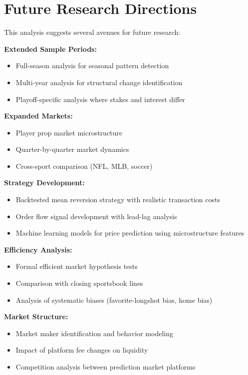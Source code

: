 \section{Future Research Directions}

This analysis suggests several avenues for future research:

\textbf{Extended Sample Periods:}
\begin{itemize}
    \item Full-season analysis for seasonal pattern detection
    \item Multi-year analysis for structural change identification
    \item Playoff-specific analysis where stakes and interest differ
\end{itemize}

\textbf{Expanded Markets:}
\begin{itemize}
    \item Player prop market microstructure
    \item Quarter-by-quarter market dynamics
    \item Cross-sport comparison (NFL, MLB, soccer)
\end{itemize}

\textbf{Strategy Development:}
\begin{itemize}
    \item Backtested mean reversion strategy with realistic transaction costs
    \item Order flow signal development with lead-lag analysis
    \item Machine learning models for price prediction using microstructure features
\end{itemize}

\textbf{Efficiency Analysis:}
\begin{itemize}
    \item Formal efficient market hypothesis tests
    \item Comparison with closing sportsbook lines
    \item Analysis of systematic biases (favorite-longshot bias, home bias)
\end{itemize}

\textbf{Market Structure:}
\begin{itemize}
    \item Market maker identification and behavior modeling
    \item Impact of platform fee changes on liquidity
    \item Competition analysis between prediction market platforms
\end{itemize}

